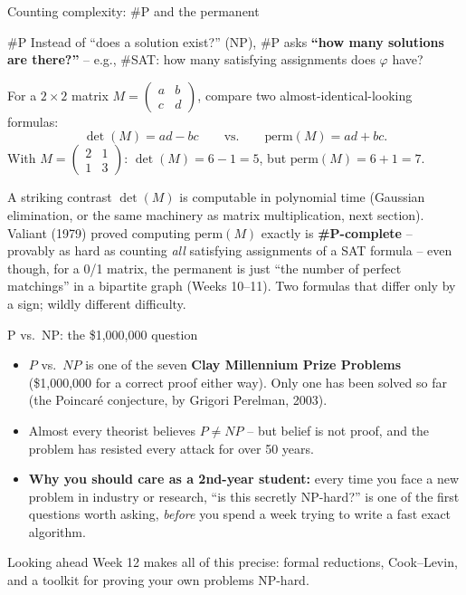 \documentclass[11pt,aspectratio=169]{beamer}
\begin{document}
\begin{frame}{Counting complexity: \#P and the permanent}
  \begin{block}{\#P}
    Instead of ``does a solution exist?'' (NP), \#P asks \textbf{``how many solutions
    are there?''} -- e.g., \#SAT: how many satisfying assignments does $\varphi$ have?
  \end{block}
  For a $2\times 2$ matrix $M = \left(\begin{smallmatrix}a&b\\c&d\end{smallmatrix}\right)$,
  compare two almost-identical-looking formulas:
  \[
    \det(M) = ad - bc \qquad \text{vs.} \qquad \mathrm{perm}(M) = ad + bc.
  \]
  With $M = \left(\begin{smallmatrix}2&1\\1&3\end{smallmatrix}\right)$:
  $\det(M) = 6 - 1 = 5$, but $\mathrm{perm}(M) = 6 + 1 = 7$.
  \begin{exampleblock}{A striking contrast}
    $\det(M)$ is computable in polynomial time (Gaussian elimination, or the same
    machinery as matrix multiplication, next section). Valiant (1979) proved computing
    $\mathrm{perm}(M)$ exactly is \textbf{\#P-complete} -- provably as hard as counting
    \emph{all} satisfying assignments of a SAT formula -- even though, for a 0/1 matrix,
    the permanent is just ``the number of perfect matchings'' in a bipartite graph
    (Weeks 10--11). Two formulas that differ only by a sign; wildly different
    difficulty.
  \end{exampleblock}
\end{frame}

\begin{frame}{P vs.\ NP: the \$1{,}000{,}000 question}
  \begin{itemize}
    \item $P$ vs.\ $NP$ is one of the seven \textbf{Clay Millennium Prize Problems}
    (\$1{,}000{,}000 for a correct proof either way). Only one has been solved so far
    (the Poincar\'e conjecture, by Grigori Perelman, 2003).
    \item Almost every theorist believes $P \ne NP$ -- but belief is not proof, and the
    problem has resisted every attack for over 50 years.
    \item \textbf{Why you should care as a 2nd-year student:} every time you face a new
    problem in industry or research, ``is this secretly NP-hard?'' is one of the first
    questions worth asking, \emph{before} you spend a week trying to write a fast
    exact algorithm.
  \end{itemize}
  \begin{alertblock}{Looking ahead}
    Week 12 makes all of this precise: formal reductions, Cook--Levin, and a toolkit for
    proving your own problems NP-hard.
  \end{alertblock}
\end{frame}
\end{document}
